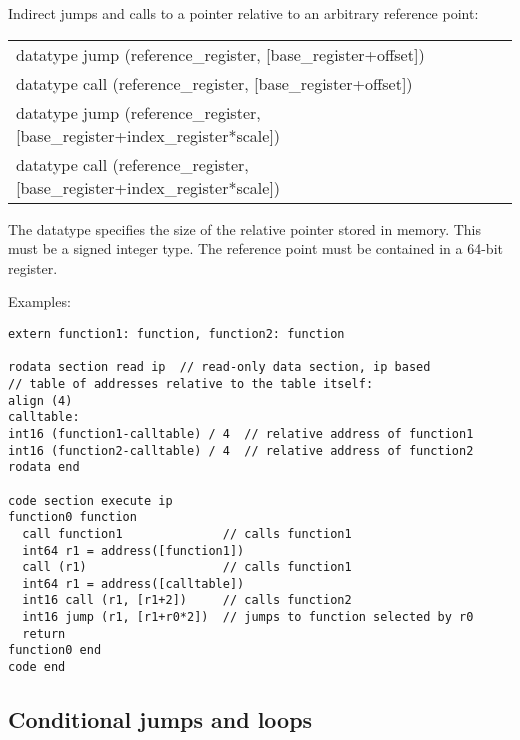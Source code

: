 \documentclass[forwardcom.tex]{subfiles}
\begin{document}
Indirect jumps and calls to a pointer relative to an arbitrary reference point:

\begin{tabular}{|p{140mm}|}
\hline
\hspace{4mm} datatype jump (reference\_register, [base\_register+offset])\\
\hspace{4mm} datatype call (reference\_register, [base\_register+offset])\\
\hspace{4mm} datatype jump (reference\_register, [base\_register+index\_register*scale])\\
\hspace{4mm} datatype call (reference\_register, [base\_register+index\_register*scale])\\
\hline
\end{tabular}
\vspace{4mm}

The datatype specifies the size of the relative pointer stored in memory. This must be a signed integer type. The reference point must be contained in a 64-bit register.
\vspace{2mm}

Examples:
\vspace{2mm}

\begin{lstlisting}[frame=single]
extern function1: function, function2: function

rodata section read ip  // read-only data section, ip based
// table of addresses relative to the table itself:
align (4)
calltable:                       
int16 (function1-calltable) / 4  // relative address of function1
int16 (function2-calltable) / 4  // relative address of function2
rodata end

code section execute ip
function0 function
  call function1              // calls function1
  int64 r1 = address([function1])
  call (r1)                   // calls function1
  int64 r1 = address([calltable])
  int16 call (r1, [r1+2])     // calls function2
  int16 jump (r1, [r1+r0*2])  // jumps to function selected by r0
  return
function0 end
code end

\end{lstlisting}
\vspace{2mm}


\subsection{Conditional jumps and loops} \label{assemblyConditionalJumps}
\end{document}
